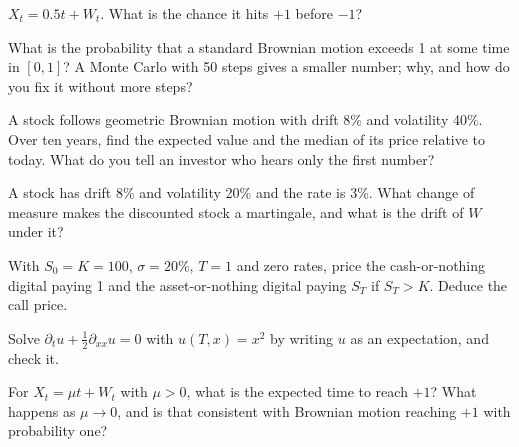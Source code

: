 \begin{interviewq}\label{iq:iv:stochastic-calculus:6}
$X_t = 0.5t + W_t$. What is the chance it hits $+1$ before $-1$?
\end{interviewq}

\begin{interviewq}\label{iq:iv:stochastic-calculus:7}
What is the probability that a standard Brownian motion exceeds 1 at some time in $[0, 1]$? A Monte Carlo with 50 steps
gives a smaller number; why, and how do you fix it without more steps?
\end{interviewq}

\begin{interviewq}\label{iq:iv:stochastic-calculus:8}
A stock follows geometric Brownian motion with drift 8\% and volatility 40\%. Over ten years, find the expected value and the
median of its price relative to today. What do you tell an investor who hears only the first number?
\end{interviewq}

\begin{interviewq}\label{iq:iv:stochastic-calculus:9}
A stock has drift 8\% and volatility 20\% and the rate is 3\%. What change of measure makes the discounted stock a
martingale, and what is the drift of $W$ under it?
\end{interviewq}

\begin{interviewq}\label{iq:iv:stochastic-calculus:10}
With $S_0 = K = 100$, $\sigma = 20\%$, $T = 1$ and zero rates, price the cash-or-nothing digital paying 1 and the
asset-or-nothing digital paying $S_T$ if $S_T > K$. Deduce the call price.
\end{interviewq}

\begin{interviewq}\label{iq:iv:stochastic-calculus:11}
Solve $\partial_t u + \tfrac12\partial_{xx}u = 0$ with $u(T, x) = x^2$ by writing $u$ as an expectation, and check it.
\end{interviewq}

\begin{interviewq}\label{iq:iv:stochastic-calculus:12}
For $X_t = \mu t + W_t$ with $\mu > 0$, what is the expected time to reach $+1$? What happens as $\mu \to 0$, and is that
consistent with Brownian motion reaching $+1$ with probability one?
\end{interviewq}

